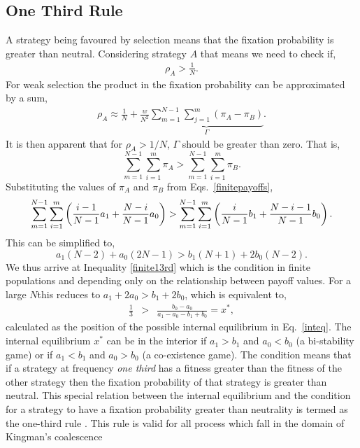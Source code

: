 \documentclass[oneside,11pt,a4paper]{book}
\begin{document}
\subsection{One Third Rule}
\label{subsec:OTR}
A strategy being favoured by selection means that the fixation probability is greater than neutral.
Considering strategy $A$ that means we need to check if,
%
\begin{eqnarray}
\rho_A > \frac{1}{N}.
\end{eqnarray}
%
For weak selection the product in the fixation probability can be approximated by a sum,
%
\begin{eqnarray}
\rho_A \approx \frac{1}{N}+\frac{w}{N^2}\underbrace{\sum_{m=1}^{N-1}\sum_{j=1}^{m}\left( \pi_A - \pi_B \right)}_{\Gamma}.
\end{eqnarray}
%
It is then apparent that for $\rho_A > 1/N$, $\Gamma$ should be greater than zero.
That is,
%
\begin{equation}
\sum_{m=1}^{N-1}\sum_{i=1}^{m} \pi_A > \sum_{m=1}^{N-1}\sum_{i=1}^{m}\pi_B. \nonumber
\end{equation}
%
Substituting the values of $\pi_A$ and $\pi_B$ from Eqs.\ \eqref{finitepayoffs},
\begin{equation}
\sum_{m=1}^{N-1}\sum_{i=1}^{m} \left(\frac{i-1}{N-1} a_1 + \frac{N-i}{N-1} a_0\right) > \sum_{m=1}^{N-1}\sum_{i=1}^{m} \left(\frac{i}{N-1} b_1 + \frac{N-i-1}{N-1} b_0 \right). \nonumber \\
\end{equation}
This can be simplified to,
\begin{equation}
a_1 (N-2) + a_0 (2 N -1) > b_1 (N+1) + 2 b_0 (N-2).
\label{finite13rd}
\end{equation}
%
We thus arrive at Inequality \ref{finite13rd} which is the condition in finite populations and depending only on the relationship between payoff values.
For a large $N$this reduces to $a_1 +2 a_0 > b_1 + 2 b_0$, which is equivalent to,
%
\begin{eqnarray}
\frac{1}{3} &>& \frac{b_0 -a_0}{a_1 - a_0 - b_1 + b_0} = x^*,
\end{eqnarray}
%
calculated as the position of the possible internal equilibrium in Eq.\ \eqref{inteq}.
The internal equilibrium $x^*$ can be in the interior if $a_1 > b_1$ and $a_0<b_0$ (a bi-stability game) or if $a_1 < b_1$ and $a_0>b_0$ (a co-existence game).
The condition means that if a strategy at frequency \textit{one third} has a fitness greater than the fitness of the other strategy then the fixation probability of that strategy is greater than neutral.
This special relation between the internal equilibrium and the condition for a strategy to have a fixation probability greater than neutrality is termed as the one-third rule \citep{ nowak:2004pw,traulsen:2006bb,imhof:2006aa,ohtsuki:2007aa,bomze:2008lr}.
This rule is valid for all process which fall in the domain of Kingman's coalescence \citep{lessard:2007aa}
\end{document}
